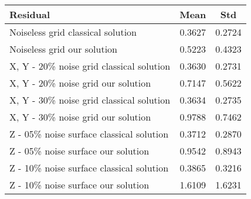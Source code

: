 {
	\begin{center}
		\begin{tabular}[]{|l|c|c|}
			\hline
			Residual                                                      & Mean   & Std \\
			\hline 
			Noiseless grid classical solution                             & 0.3627 & 0.2724 \\
			\hline
			Noiseless grid our solution                                   & 0.5223 & 0.4323 \\
			\hline
			X, Y - 20\% noise grid classical solution                     & 0.3630 & 0.2731 \\
			\hline
			X, Y - 20\% noise grid our solution                           & 0.7147 & 0.5622 \\
			\hline
			X, Y - 30\% noise grid classical solution                     & 0.3634 & 0.2735 \\
			\hline
			X, Y - 30\% noise grid our solution                           & 0.9788 & 0.7462 \\
			\hline
			Z - 05\% noise surface classical solution                     & 0.3712 & 0.2870 \\
			\hline
			Z - 05\% noise surface our solution                           & 0.9542 & 0.8943 \\
			\hline
			Z - 10\% noise surface classical solution                     & 0.3865 & 0.3216 \\
			\hline
			Z - 10\% noise surface our solution                           & 1.6109 & 1.6231 \\
			\hline
		\end{tabular}
	\end{center} 
}

